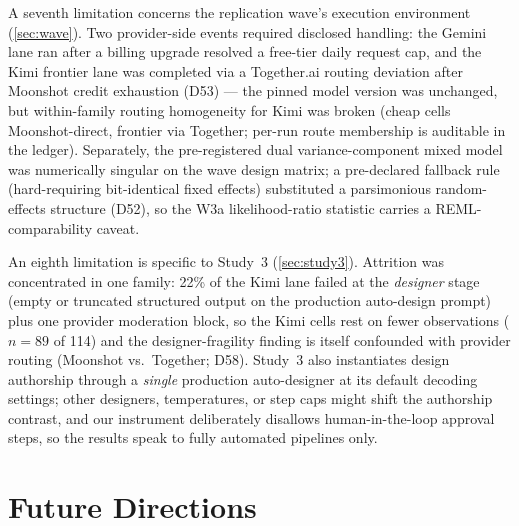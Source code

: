 \documentclass[12pt,a4paper]{article}
\begin{document}
A seventh limitation concerns the replication wave's execution environment
(\cref{sec:wave}). Two provider-side events required disclosed handling: the
Gemini lane ran after a billing upgrade resolved a free-tier daily request
cap, and the Kimi frontier lane was completed via a Together.ai routing
deviation after Moonshot credit exhaustion (D53) --- the pinned model version
was unchanged, but within-family routing homogeneity for Kimi was broken
(cheap cells Moonshot-direct, frontier via Together; per-run route membership
is auditable in the ledger). Separately, the pre-registered dual
variance-component mixed model was numerically singular on the wave design
matrix; a pre-declared fallback rule (hard-requiring bit-identical fixed
effects) substituted a parsimonious random-effects structure (D52), so the
W3a likelihood-ratio statistic carries a REML-comparability caveat.

An eighth limitation is specific to Study~3 (\cref{sec:study3}). Attrition was
concentrated in one family: 22\% of the Kimi lane failed at the
\emph{designer} stage (empty or truncated structured output on the production
auto-design prompt) plus one provider moderation block, so the Kimi cells rest
on fewer observations ($n = 89$ of 114) and the designer-fragility finding is
itself confounded with provider routing (Moonshot vs.\ Together; D58). Study~3
also instantiates design authorship through a \emph{single} production
auto-designer at its default decoding settings; other designers, temperatures,
or step caps might shift the authorship contrast, and our instrument
deliberately disallows human-in-the-loop approval steps, so the results speak
to fully automated pipelines only.

\section{Future Directions}\label{sec:future}
\end{document}
